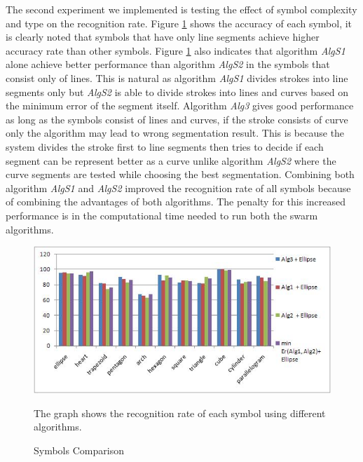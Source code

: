 \documentclass[a4paper,10pt]{IEEEconf}
\begin{document}
The second experiment we implemented is testing the effect of symbol complexity and type on the recognition rate. Figure \ref{fig:test2} shows the accuracy of each symbol, it is clearly noted that symbols that have only line segments achieve higher accuracy rate than other symbols. Figure \ref{fig:test2} also indicates that algorithm \textsl{AlgS1} alone achieve better performance than algorithm   \textsl{AlgS2} in the symbols that consist only of lines. This is natural as algorithm  \textsl{AlgS1} divides strokes into line segments only but \textsl{AlgS2} is able to divide strokes into lines and curves based on the minimum error of the segment itself. Algorithm \textsl{Alg3} gives good performance as long as the symbols consist of lines and curves, if the stroke consists of curve only  the algorithm may lead to wrong segmentation result. This is because the system divides the stroke first to line segments then tries to decide if each segment can be represent better as a curve unlike algorithm \textsl{AlgS2} where the curve segments are tested while choosing the best segmentation.  Combining both algorithm \textsl{AlgS1} and \textsl{AlgS2} improved the recognition rate of all symbols because of combining the advantages of both algorithms. The penalty for this increased performance is in the computational time needed to run both the swarm algorithms.  \\
\begin{figure}[]
	\centering
		\includegraphics[scale=0.8]{images/test2.jpg}
	\caption{Symbols Comparison} The graph shows the recognition rate of each symbol using different algorithms. 
	\label{fig:test2}
\end{figure}
\end{document}
